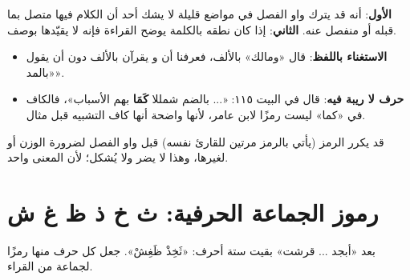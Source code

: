 \begin{mufradat}
\end{mufradat}
\maana
\textbf{الأول}: أنه قد يترك واو الفصل في مواضع قليلة لا يشك أحد أن الكلام فيها متصل بما قبله أو منفصل عنه.
\textbf{الثاني}: إذا كان نطقه بالكلمة يوضح القراءة فإنه لا يقيّدها بوصف.

\begin{amthila}
\begin{itemize}
\item \textbf{الاستغناء باللفظ}: قال «ومالك» بالألف، فعرفنا أن \Kisai{} و\Asim{} يقرآن بالألف دون أن يقول «بالمد».
\item \textbf{حرف لا ريبة فيه}: قال في البيت ١١٥: «... بالضم شمللا \textbf{كَمَا} بهم الأسباب»، فالكاف في «كما» ليست رمزًا لابن عامر، لأنها واضحة أنها كاف التشبيه قبل مثال.
\end{itemize}
\end{amthila}

\begin{mufradat}
\end{mufradat}
\maana قد يكرر الرمز (يأتي بالرمز مرتين للقارئ نفسه) قبل واو الفصل لضرورة الوزن أو لغيرها، وهذا لا يضر ولا يُشكل؛ لأن المعنى واحد.

\section{رموز الجماعة الحرفية: ث خ ذ ظ غ ش}

\begin{tanbih}
بعد «أبجد ... قرشت» بقيت ستة أحرف: «ثَخِذْ ظَغِشْ». جعل كل حرف منها رمزًا لجماعة من القراء.
\end{tanbih}

\begin{mufradat}
\end{mufradat}

\begin{mufradat}
\end{mufradat}

